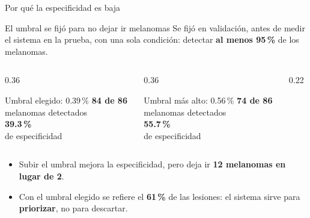 \documentclass[aspectratio=169,10pt]{beamer}
\newcommand{\cifram}[1]{{\fontsize{16}{18}\selectfont\bfseries\color{azulfi}#1}}
\begin{document}
\begin{frame}{Por qué la especificidad es baja}
  \begin{block}{El umbral se fijó para no dejar ir melanomas}
    Se fijó en validación, antes de medir el sistema en la prueba, con una sola condición: detectar \textbf{al menos 95\,\%} de los melanomas.
  \end{block}
  \vspace{0.4em}
  \begin{columns}[T]
    \begin{column}{0.36\textwidth}
      \begin{exampleblock}{Umbral elegido: 0.39\,\%}
        \centering
        \cifram{84 de 86}\\ melanomas detectados\\[0.4em]
        \cifram{39.3\,\%}\\ de especificidad
      \end{exampleblock}
    \end{column}
    \begin{column}{0.36\textwidth}
      \begin{block}{Umbral más alto: 0.56\,\%}
        \centering
        \cifram{74 de 86}\\ melanomas detectados\\[0.4em]
        \cifram{55.7\,\%}\\ de especificidad
      \end{block}
    \end{column}
    \begin{column}{0.22\textwidth}
      \centering
    \end{column}
  \end{columns}
  \vspace{0.3em}
  \begin{itemize}
    \item Subir el umbral mejora la especificidad, pero deja ir \textbf{12 melanomas en lugar de 2}.
    \item Con el umbral elegido se refiere el \textbf{61\,\%} de las lesiones: el sistema sirve para \textbf{priorizar}, no para descartar.
  \end{itemize}
\end{frame}
\end{document}
